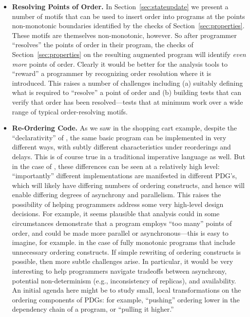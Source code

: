 \begin{itemize}
    \item {\bf Resolving Points of Order.}  In Section~\ref{sec:stateupdate} we present a number of motifs that can be used to insert order into programs at the points non-monotonic boundaries identified by the checks of Section~\ref{sec:properties}.  These motifs are themselves non-monotonic, however.  So after programmer ``resolves'' the points of order in their program, the checks of Section~\ref{sec:properties} on the resulting augmented program will identify {\em even more} points of order.  Clearly it would be better for the analysis tools to ``reward'' a programmer by recognizing order resolution where it is introduced.  This raises a number of challenges including (a) suitably defining what is required to ``resolve'' a point of order and (b) building tests that can verify that order has been resolved---tests that at minimum work over a wide range of typical order-resolving motifs.    
    
    \item {\bf Re-Ordering Code.} As we saw in the shopping cart example, despite the ``declarativity'' of \lang, the same basic program can be implemented in very different ways, with subtly different characteristics under reorderings and delays.  This is of course true in a traditional imperative language as well.  But in the case of \lang, these differences can be seen at a relatively high level: ``importantly'' different implementations are manifested in different PDG's, which will likely have differing numbers of ordering constructs, and hence will enable differing degrees of asynchrony and parallelism.  This raises the possibility of helping programmers address some very high-level design decisions.  For example, it seems plausible that analysis could in some circumstances demonstrate that a program employs ``too many'' points of order, and could be made more parallel or asynchronous---this is easy to imagine, for example. in the case of fully monotonic programs that include unnecessary ordering constructs.  If simple rewriting of ordering constructs is possible, then more subtle challenges arise.  In particular, it would be very interesting to help programmers navigate tradeoffs between asynchrony, potential non-determinism (e.g., inconsistency of replicas), and availability.  An initial agenda here might be to study small, local transformations on the ordering components of PDGs: for example, ``pushing'' ordering lower in the dependency chain of a program, or ``pulling it higher.''


\end{itemize}
